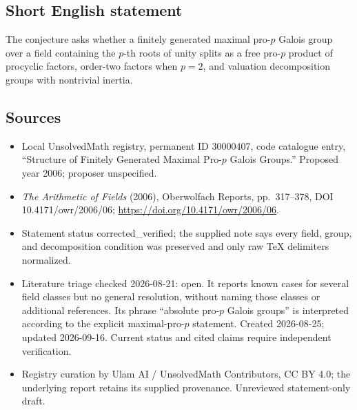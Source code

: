 \documentclass[11pt]{article}
\begin{document}
\subsection{Short English statement}
The conjecture asks whether a finitely generated maximal pro-$p$ Galois group over a field containing the $p$-th roots of unity splits as a free pro-$p$ product of procyclic factors, order-two factors when $p=2$, and valuation decomposition groups with nontrivial inertia.
\subsection{Sources}
\begin{itemize}
\item Local UnsolvedMath registry, permanent ID 30000407, code catalogue entry, ``Structure of Finitely Generated Maximal Pro-$p$ Galois Groups.'' Proposed year 2006; proposer unspecified.
\item \emph{The Arithmetic of Fields} (2006), Oberwolfach Reports, pp.\ 317--378, DOI 10.4171/owr/2006/06; \url{https://doi.org/10.4171/owr/2006/06}.
\item Statement status corrected\_verified; the supplied note says every field, group, and decomposition condition was preserved and only raw TeX delimiters normalized.
\item Literature triage checked 2026-08-21: open. It reports known cases for several field classes but no general resolution, without naming those classes or additional references. Its phrase ``absolute pro-$p$ Galois groups'' is interpreted according to the explicit maximal-pro-$p$ statement. Created 2026-08-25; updated 2026-09-16. Current status and cited claims require independent verification.
\item Registry curation by Ulam AI / UnsolvedMath Contributors, CC BY 4.0; the underlying report retains its supplied provenance. Unreviewed statement-only draft.
\end{itemize}
\end{document}
